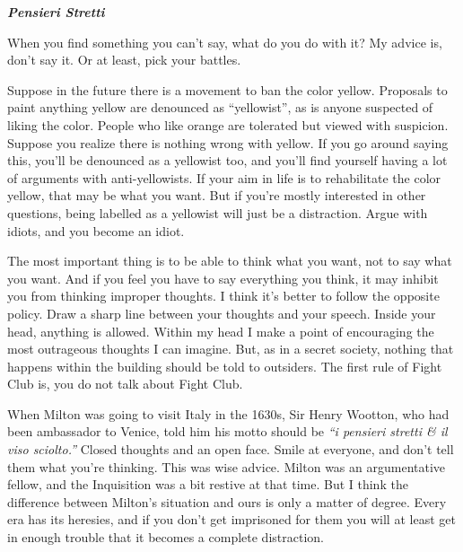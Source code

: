 \textbf{\emph{Pensieri Stretti}}

When you find something you can't say, what do you do with it? My advice
is, don't say it. Or at least, pick your battles.

Suppose in the future there is a movement to ban the color yellow.
Proposals to paint anything yellow are denounced as ``yellowist'', as is
anyone suspected of liking the color. People who like orange are
tolerated but viewed with suspicion. Suppose you realize there is
nothing wrong with yellow. If you go around saying this, you'll be
denounced as a yellowist too, and you'll find yourself having a lot of
arguments with anti-yellowists. If your aim in life is to rehabilitate
the color yellow, that may be what you want. But if you're mostly
interested in other questions, being labelled as a yellowist will just
be a distraction. Argue with idiots, and you become an idiot.

The most important thing is to be able to think what you want, not to
say what you want. And if you feel you have to say everything you think,
it may inhibit you from thinking improper thoughts. I think it's better
to follow the opposite policy. Draw a sharp line between your thoughts
and your speech. Inside your head, anything is allowed. Within my head I
make a point of encouraging the most outrageous thoughts I can imagine.
But, as in a secret society, nothing that happens within the building
should be told to outsiders. The first rule of Fight Club is, you do not
talk about Fight Club.

When Milton was going to visit Italy in the 1630s, Sir Henry Wootton,
who had been ambassador to Venice, told him his motto should be
\emph{``i pensieri stretti \& il viso sciolto.''} Closed thoughts and an
open face. Smile at everyone, and don't tell them what you're thinking.
This was wise advice. Milton was an argumentative fellow, and the
Inquisition was a bit restive at that time. But I think the difference
between Milton's situation and ours is only a matter of degree. Every
era has its heresies, and if you don't get imprisoned for them you will
at least get in enough trouble that it becomes a complete distraction.

